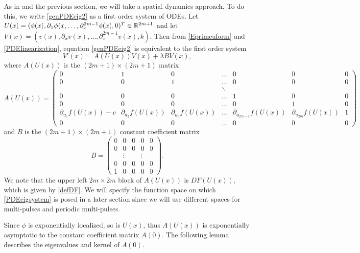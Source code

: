 \documentclass[thesis.tex]{subfiles}
\begin{document}
As in \cite{Sandstede1998} and the previous section, we will take a spatial dynamics approach. To do this, we write \cref{genPDEeig2} as a first order system of ODEs. Let $U(x) = (\phi(x), \partial_x \phi(x, \dots, \partial_x^{2m-1}\phi(x), 0)^T \in \mathbb{R}^{2m+1}$ and let $V(x) = (v(x), \partial_x v(x), \dots, \partial_x^{2m-1} v(x), k)$. Then from \cref{Eprimeuform} and \cref{PDElinearization}, equation \cref{genPDEeig2} is equivalent to the first order system
\begin{equation}\label{PDEeigsystem}
V'(x) = A(U(x))V(x) + \lambda B V(x),
\end{equation}
where $A(U(x))$ is the $(2m+1)\times(2m+1)$ matrix
\begin{equation}\label{defAphi}
A(U(x)) = 
\begin{pmatrix}
0 & 1 & 0 & \dots & 0 & 0 & 0 \\
0 & 0 & 1 & \dots & 0 & 0 & 0\\
&  && \ddots \\
0 & 0 & 0 & \dots & 1 & 0 & 0 \\
0 & 0 & 0 & \dots & 0 & 1 & 0 \\
\partial_{u_1}f(U(x)) - c & \partial_{u_2}f(U(x)) & \partial_{u_3}f(U(x)) & \dots & \partial_{u_{2m-1}}f(U(x)) & \partial_{u_{2m}}f(U(x)) & 1 \\
0 & 0 & 0 & \dots & 0 & 0 & 0
\end{pmatrix}
\end{equation}
and $B$ is the $(2m+1) \times (2m+1)$ constant coefficient matrix
\begin{equation}\label{DefB}
B = \begin{pmatrix}0 & 0 & 0 & 0 & 0 \\0 & 0 & 0 & 0 & 0 \\  & 
\vdots & & \vdots & \\0 & 0 & 0 & 0 & 0 \\1 & 0 & 0 & 0 & 0 \end{pmatrix}.
\end{equation}
We note that the upper left $2m \times 2m$ block of $A(U(x))$ is $DF(U(x))$, which is given by \cref{defDF}. We will specify the function space on which \cref{PDEeigsystem} is posed in a later section since we will use different spaces for multi-pulses and periodic multi-pulses.

Since $\phi$ is exponentially localized, so is $U(x)$, thus $A(U(x))$ is exponentially asymptotic to the constant coefficient matrix $A(0)$. The following lemma describes the eigenvalues and kernel of $A(0)$.
\end{document}
